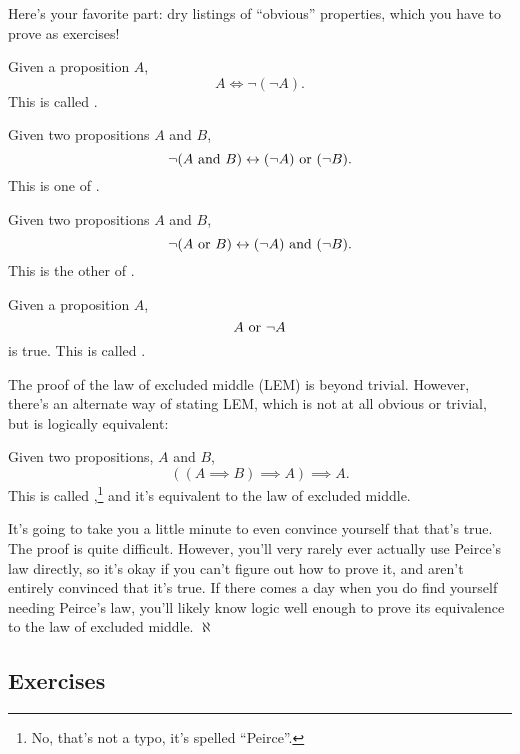 Here's your favorite part: dry listings of ``obvious'' properties,
which you have to prove as exercises!

\begin{lemma}
  \label{double-negation}
  Given a proposition $A$,
  $$A \iff \lnot(\lnot A).$$ This is called .
\end{lemma}
\begin{lemma}
  \label{de-morgan-1}
  Given two propositions $A$ and $B$,
  $$\lnot(A \text{ and } B) \leftrightarrow (\lnot A) \text{ or } (\lnot B).$$ This is one of
  .
\end{lemma}
\begin{lemma}
  \label{de-morgan-2}
  Given two propositions $A$ and $B$,
  $$\lnot(A \text{ or } B) \leftrightarrow (\lnot A) \text{ and } (\lnot B).$$ This is the
  other of .
\end{lemma}

\begin{lemma}
  \label{lem}
  Given a proposition $A$, $$A \text{ or } \lnot A$$ is true. This is called
  .
\end{lemma}

The proof of the law of excluded middle (LEM) is beyond
trivial. However, there's an alternate way of stating LEM, which is
not at all obvious or trivial, but is logically equivalent:

\begin{lemma}
  \label{peirce}
  Given two propositions, $A$ and $B$,
  $$((A \implies B) \implies A) \implies A.$$ This is called
  ,\footnote{No, that's not a typo, it's spelled
    ``Peirce''.} and it's equivalent to the law of excluded middle.
\end{lemma}

It's going to take you a little minute to even convince yourself that
that's true. The proof is quite difficult. However, you'll very rarely
ever actually use Peirce's law directly, so it's okay if you can't
figure out how to prove it, and aren't entirely convinced that it's
true. If there comes a day when you do find yourself needing Peirce's
law, you'll likely know logic well enough to prove its equivalence to
the law of excluded middle. $\aleph$

\subsection{Exercises}

